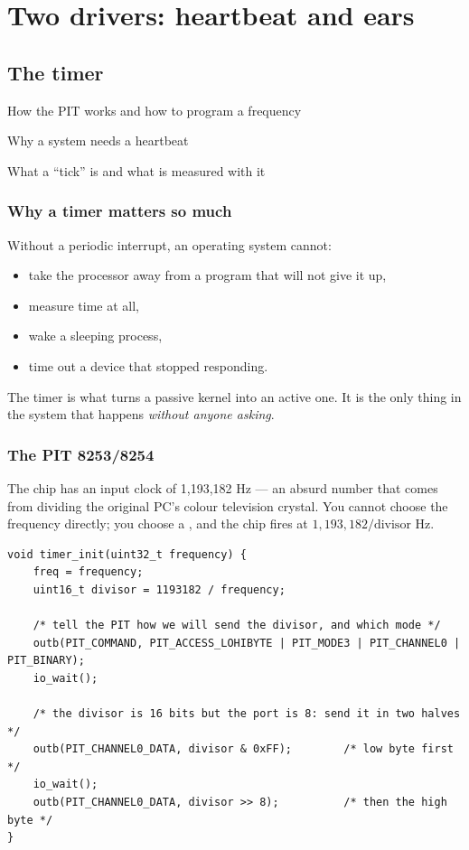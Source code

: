 \part{Two drivers: heartbeat and ears}

\chapter{The timer}

\begin{goals}
  \item How the PIT works and how to program a frequency
  \item Why a system needs a heartbeat
  \item What a ``tick'' is and what is measured with it
\end{goals}

\section{Why a timer matters so much}

Without a periodic interrupt, an operating system cannot:

\begin{itemize}
  \item take the processor away from a program that will not give it up,
  \item measure time at all,
  \item wake a sleeping process,
  \item time out a device that stopped responding.
\end{itemize}

The timer is what turns a passive kernel into an active one. It is the only thing in the system
that happens \emph{without anyone asking}.

\section{The PIT 8253/8254}

The chip has an input clock of 1,193,182 Hz --- an absurd number that comes from dividing the
original PC's colour television crystal. You cannot choose the frequency directly; you choose a
, and the chip fires at $1{,}193{,}182 / \text{divisor}$ Hz.

\begin{lstlisting}[style=c]
void timer_init(uint32_t frequency) {
    freq = frequency;
    uint16_t divisor = 1193182 / frequency;

    /* tell the PIT how we will send the divisor, and which mode */
    outb(PIT_COMMAND, PIT_ACCESS_LOHIBYTE | PIT_MODE3 | PIT_CHANNEL0 | PIT_BINARY);
    io_wait();

    /* the divisor is 16 bits but the port is 8: send it in two halves */
    outb(PIT_CHANNEL0_DATA, divisor & 0xFF);        /* low byte first */
    io_wait();
    outb(PIT_CHANNEL0_DATA, divisor >> 8);          /* then the high byte */
}
\end{lstlisting}


